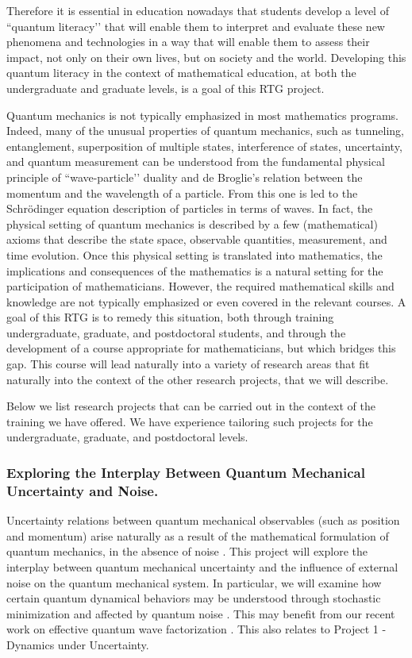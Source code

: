 \documentclass[11pt]{NSFamsart}
\begin{document}
Therefore it is essential in education nowadays that students develop a level of ``quantum literacy’’ \cite{foti2021quantum} that will enable them to interpret and evaluate these new phenomena and technologies in a way that will enable them to assess their impact, not only on their own  lives, but on society and the world. Developing this quantum literacy in the context of mathematical education,    at both the undergraduate and graduate   levels,  is a goal of this RTG project.


Quantum mechanics is not typically emphasized in most mathematics programs.  Indeed, many of the unusual properties of quantum mechanics, such as tunneling, entanglement, superposition of multiple states, interference of states, uncertainty, and quantum measurement can be understood from the fundamental physical principle of ``wave-particle’’ duality and de Broglie’s relation between the momentum and the wavelength of a particle.  From this one is led to the Schr\"{o}dinger equation description of particles in terms of waves. In fact, the physical setting of quantum mechanics is described by a few (mathematical) axioms that describe the state space, observable quantities, measurement, and time evolution.  Once this physical setting is translated into mathematics, the implications and consequences of the mathematics is a natural setting for the participation of mathematicians. However, the required mathematical skills and knowledge are not typically emphasized or even covered in the relevant courses. A goal of this RTG is to remedy this situation, both through training undergraduate, graduate, and postdoctoral students, and through the development of a course appropriate for mathematicians, but which bridges this gap. This course will lead naturally into a variety of research areas that fit naturally into the context of the other research projects, that we will describe.


\medskip
\noindent
 Below we list   research projects that can be  carried out in the context of the training we have offered.  We have experience tailoring such projects for the undergraduate, graduate, and postdoctoral levels.
 

\subsubsection*{Exploring the Interplay Between Quantum Mechanical Uncertainty and Noise.} Uncertainty relations between quantum mechanical observables (such as position and momentum) arise naturally as a result of the mathematical formulation of quantum mechanics, in the absence of noise \cite{Griffiths2018IntroductionTQ}. This project will explore the interplay between quantum mechanical uncertainty and the influence of external noise \cite{Lindgren2019QuantumMC, Nagasawa2000StochasticPI} on the quantum mechanical system. In particular, we will examine how certain quantum dynamical behaviors  may be understood through stochastic minimization \cite{Lindgren2019QuantumMC} and affected by quantum noise \cite{Nurdin2019QuantumSP}. This may   benefit from our recent work on effective quantum wave factorization \cite{ZHANG2020132573}. This also relates to   Project 1 - Dynamics under Uncertainty.
\end{document}
